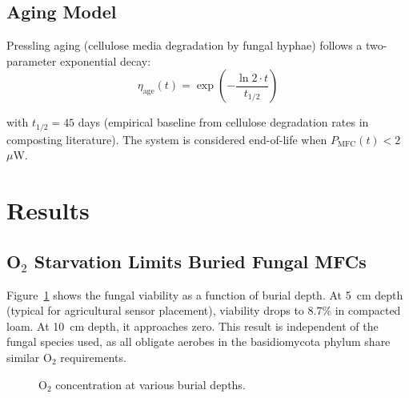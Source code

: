 \documentclass[twocolumn,10pt,a4paper]{article}
\begin{document}
\subsection{Aging Model}

Pressling aging (cellulose media degradation by fungal hyphae) follows a
two-parameter exponential decay:
\begin{equation}
\eta_{\text{age}}(t) = \exp\left(-\frac{\ln 2 \cdot t}{t_{1/2}}\right)
\label{eq:aging}
\end{equation}

with $t_{1/2} = 45$ days (empirical baseline from cellulose degradation
rates in composting literature). The system is considered end-of-life when
$P_{\text{MFC}}(t) < 2$~$\mu$W.

\section{Results}
\label{sec:results}

\subsection{O$_2$ Starvation Limits Buried Fungal MFCs}

Figure~\ref{fig:o2} shows the fungal viability as a function of burial depth.
At 5~cm depth (typical for agricultural sensor placement), viability drops to
8.7\% in compacted loam. At 10~cm depth, it approaches zero. This result is
independent of the fungal species used, as all obligate aerobes in the
basidiomycota phylum share similar O$_2$ requirements.

\begin{figure}[H]
\centering
{}
\caption{O$_2$ concentration at various burial depths.}
\label{fig:o2}
\end{figure}
\end{document}
